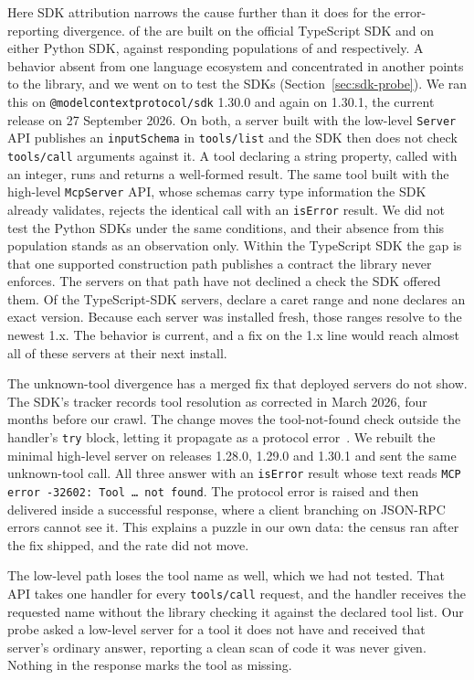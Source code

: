 Here SDK attribution narrows the cause further than it does for the
error-reporting divergence. \SilentExecTS{} of the \NSilentExec{} are built on
the official TypeScript SDK and \SilentExecPy{} on either Python SDK, against
responding populations of \SDKPopTS{} and \SDKPopPy{} respectively. A behavior absent
from one language ecosystem and concentrated in another points to the library, and we
went on to test the SDKs (Section~\ref{sec:sdk-probe}). We ran this on
\texttt{@modelcontextprotocol/sdk} 1.30.0 and again on 1.30.1, the current release on
27 September 2026. On both, a server built with the low-level \texttt{Server} API publishes an
\texttt{inputSchema} in \texttt{tools/list} and the SDK then does not check
\texttt{tools/call} arguments against it. A tool declaring a string property, called
with an integer, runs and returns a well-formed result. The same tool built with the
high-level \texttt{McpServer} API, whose schemas carry type information the SDK
already validates, rejects the identical call with an \texttt{isError} result. We did
not test the Python SDKs under the same conditions, and their absence from this
population stands as an observation only. Within
the TypeScript SDK the gap is that one supported construction path publishes a
contract the library never enforces. The servers on that path have not declined a check
the SDK offered them. Of the \SilentExecTS{} TypeScript-SDK servers,
\SilentExecTSCaret{} declare a caret range and none declares an exact version.
Because each server was installed fresh, those ranges resolve to the newest 1.x. The
behavior is current, and a fix on the 1.x line would reach almost all of these
servers at their next install.

The unknown-tool divergence has a merged fix that deployed servers do not show. The
SDK's tracker records tool resolution as corrected in March 2026, four months before
our crawl. The change moves the tool-not-found check outside the handler's
\texttt{try} block, letting it propagate as a protocol error~\cite{sdkpr1389,sdkissue1510}.
We rebuilt the minimal high-level server on releases 1.28.0, 1.29.0 and 1.30.1 and
sent the same unknown-tool call. All three answer with an \texttt{isError} result
whose text reads \texttt{MCP error -32602: Tool \ldots{} not found}. The protocol
error is raised and then delivered inside a successful response, where a client
branching on JSON-RPC errors cannot see it. This explains a puzzle in our own data:
the census ran after the fix shipped, and the rate did not move.

The low-level path loses the tool name as well, which we had not tested. That API
takes one handler for every \texttt{tools/call} request, and the handler receives the
requested name without the library checking it against the declared tool list. Our
probe asked a low-level server for a tool it does not have and received that server's
ordinary answer, reporting a clean scan of code it was never given. Nothing in the
response marks the tool as missing.

